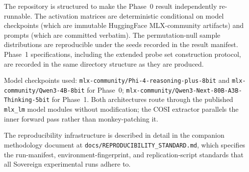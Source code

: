 The repository is structured to make the Phase~0 result independently
re-runnable. The activation matrices are deterministic conditional on
model checkpoints (which are immutable HuggingFace MLX-community
artifacts) and prompts (which are committed verbatim). The
permutation-null sample distributions are reproducible under the seeds
recorded in the result manifest. Phase~1 specifications, including the
extended probe set construction protocol, are recorded in the same
directory structure as they are produced.

Model checkpoints used: \texttt{mlx-community/Phi-4-reasoning-plus-8bit}
and \texttt{mlx-community/Qwen3-4B-8bit} for Phase~0;
\texttt{mlx-community/Qwen3-Next-80B-A3B-Thinking-5bit} for Phase~1.
Both architectures route through the published \texttt{mlx\_lm} model
modules without modification; the COSI extractor parallels the inner
forward pass rather than monkey-patching it.

The reproducibility infrastructure is described in detail in the
companion methodology document at
\texttt{docs/REPRODUCIBILITY\_STANDARD.md}, which specifies the
run-manifest, environment-fingerprint, and replication-script standards
that all Sovereign experimental runs adhere to.
